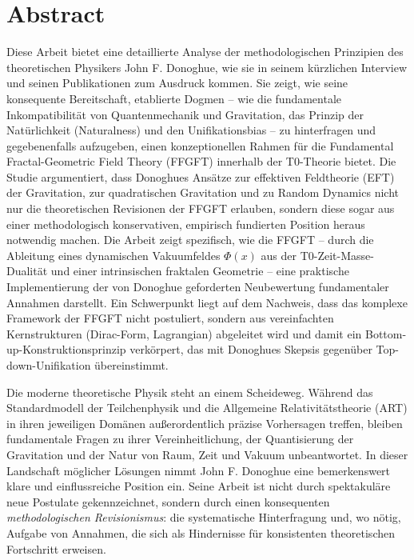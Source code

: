 
\section*{Abstract}
		Diese Arbeit bietet eine detaillierte Analyse der methodologischen Prinzipien des theoretischen Physikers John F. Donoghue, wie sie in seinem kürzlichen Interview \cite{DonoghueInterview2025} und seinen Publikationen zum Ausdruck kommen. Sie zeigt, wie seine konsequente Bereitschaft, etablierte Dogmen – wie die fundamentale Inkompatibilität von Quantenmechanik und Gravitation, das Prinzip der Natürlichkeit (Naturalness) und den Unifikationsbias – zu hinterfragen und gegebenenfalls aufzugeben, einen konzeptionellen Rahmen für die Fundamental Fractal-Geometric Field Theory (FFGFT) innerhalb der T0-Theorie bietet. Die Studie argumentiert, dass Donoghues Ansätze zur effektiven Feldtheorie (EFT) der Gravitation, zur quadratischen Gravitation und zu Random Dynamics nicht nur die theoretischen Revisionen der FFGFT erlauben, sondern diese sogar aus einer methodologisch konservativen, empirisch fundierten Position heraus notwendig machen. Die Arbeit zeigt spezifisch, wie die FFGFT – durch die Ableitung eines dynamischen Vakuumfeldes $\Phi(x)$ aus der T0-Zeit-Masse-Dualität und einer intrinsischen fraktalen Geometrie – eine praktische Implementierung der von Donoghue geforderten Neubewertung fundamentaler Annahmen darstellt. Ein Schwerpunkt liegt auf dem Nachweis, dass das komplexe Framework der FFGFT nicht postuliert, sondern aus vereinfachten Kernstrukturen (Dirac-Form, Lagrangian) abgeleitet wird und damit ein Bottom-up-Konstruktionsprinzip verkörpert, das mit Donoghues Skepsis gegenüber Top-down-Unifikation übereinstimmt.

	
	
	
	Die moderne theoretische Physik steht an einem Scheideweg. Während das Standardmodell der Teilchenphysik und die Allgemeine Relativitätstheorie (ART) in ihren jeweiligen Domänen außerordentlich präzise Vorhersagen treffen, bleiben fundamentale Fragen zu ihrer Vereinheitlichung, der Quantisierung der Gravitation und der Natur von Raum, Zeit und Vakuum unbeantwortet. In dieser Landschaft möglicher Lösungen nimmt John F. Donoghue eine bemerkenswert klare und einflussreiche Position ein. Seine Arbeit ist nicht durch spektakuläre neue Postulate gekennzeichnet, sondern durch einen konsequenten \emph{methodologischen Revisionismus}: die systematische Hinterfragung und, wo nötig, Aufgabe von Annahmen, die sich als Hindernisse für konsistenten theoretischen Fortschritt erweisen.
	
